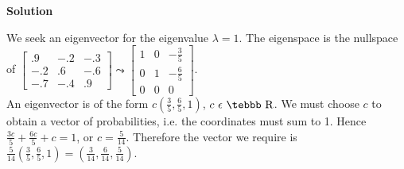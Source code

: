 \begin{enumerate}
\noindent \textbf{Solution}

We seek an eigenvector for the eigenvalue $\lambda=1$. The
eigenspace is the nullspace of $\left[
\begin {array}{rrr} .9&-.2&-.3 \\ -.2&.6&-.6 \\-.7&-.4&.9 \end {array}\right]
\leadsto \left[ \begin {array}{rrr} 1&0&-\frac{3}{5} \\ 0&1&-\frac{6}{5} \\
0&0&0 \end {array} \right]$.\\
An eigenvector is of the form $c\left( \frac{3}{5}, \frac{6}{5},1
\right)$, $c~\epsilon~ \mbox {\tebbb R}$. We must choose $c$ to
obtain a vector of probabilities, i.e. the coordinates must sum to
1. Hence $\frac{3c}{5}+\frac{6c}{5}+c=1$, or $c=\frac{5}{14}$.
Therefore the vector we require is $\frac{5}{14} \left(
\frac{3}{5}, \frac{6}{5},1 \right)=\left( \frac{3}{14},
\frac{6}{14}, \frac{5}{14} \right)$.
\end{enumerate}
\newpage
\markboth{}{}

